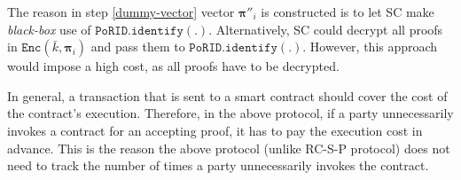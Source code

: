 \begin{remark}
The reason in step \ref{dummy-vector} vector $ {\bm{\pi}}''_{\scriptscriptstyle i}$ is constructed  is to let SC make \emph{black-box}  use of $\mathtt{PoRID.identify}(.)$. Alternatively, SC could decrypt all proofs in $\mathtt{Enc}(\bar{k}, {\bm{\pi}}_{\scriptscriptstyle i})$ and pass them to $\mathtt{PoRID.identify}(.)$. However, this approach would impose a high cost, as all proofs have to be decrypted. 
\end{remark}

\begin{remark}
In general, a transaction that is sent   to a smart contract should  cover the cost of the contract's execution. Therefore, in the above protocol, if a party unnecessarily invokes a contract for an accepting proof, it has to pay the execution cost in advance. This is the reason the above protocol (unlike RC-S-P protocol) does not need to track the number of times a party unnecessarily invokes the contract.    
\end{remark}


%



